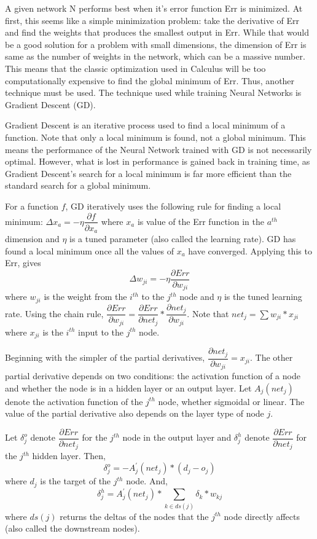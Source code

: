 \documentclass[twoside,11pt]{article}
\newcommand{\jth}{$j^{th}$ }
\begin{document}
A given network N performs best when it's error function Err is minimized.
At first, this seems like a simple minimization problem: take the derivative of Err and find the weights that produces the smallest output in Err.
While that would be a good solution for a problem with small dimensions, the dimension of Err is same as the number of weights in the network, which can be a massive number.
This means that the classic optimization used in Calculus will be too computationally expensive to find the global minimum of Err. Thus, another technique must be used.
The technique used while training Neural Networks is Gradient Descent (GD).

Gradient Descent is an iterative process used to find a local minimum of a function. Note that only a local minimum is found, not a global minimum.
This means the performance of the Neural Network trained with GD is not necessarily optimal.
However, what is lost in performance is gained back in training time, as Gradient Descent's search for a local minimum is far more efficient than the standard search for a global minimum.

For a function $f$, GD iteratively uses the following rule for finding a local minimum:
$\Delta x_a = - \eta \dfrac{\partial f}{\partial x_a}$ where $x_a$ is value of the Err function in the $a^{th}$ dimension and $\eta$ is a tuned parameter (also called the learning rate). GD has found a local minimum once all the values of $x_a$ have converged.
Applying this to Err, gives
$$\Delta w_{ji} = - \eta \dfrac{\partial Err}{\partial w_{ji}}$$
where $w_{ji}$ is the weight from the $i^{th}$ to the $j^{th}$ node and $\eta$ is the tuned learning rate. Using the chain rule,
$\dfrac{\partial Err}{\partial w_{ji}} = \dfrac{\partial Err}{\partial net_{j}} * \dfrac{\partial net_j}{\partial w_{ji}}$. Note that $net_j = \sum w_{ji} * x_{ji}$ where $x_{ji}$ is the $i^{th}$ input to the $j^{th}$ node.

Beginning with the simpler of the partial derivatives, $\dfrac{\partial net_j}{\partial w_{ji}} = x_{ji}$.
The other partial derivative depends on two conditions: the activation function of a node and whether the node is in a hidden layer or an output layer. Let $A_j(net_j)$ denote the activation function of the \jth node, whether sigmoidal or linear. 
The value of the partial derivative also depends on the layer type of node $j$. 

Let $\delta _j^o$ denote $\dfrac{\partial Err}{\partial net_{j}}$ for the \jth node in the output layer and $\delta ^h_j$ denote $\dfrac{\partial Err}{\partial net_{j}}$ for the \jth hidden layer. 
Then, 
$$\delta _j^o = -A^\prime _j (net_j) * (d_j - o_j)$$
where $d_j$ is the target of the \jth node. And, 
$$\delta ^h_j = A^\prime _j (net_j) * \sum_{k \in ds(j)} \delta _k * w_{kj}$$ 
where $ds(j)$ returns the deltas of the nodes that the \jth node directly affects (also called the downstream nodes).
\end{document}
